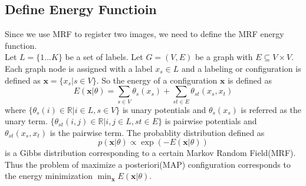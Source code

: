 \documentclass{article} %
\begin{document}
	\subsection{Define Energy Functioin}
	Since we use MRF to register two images, we need to define the MRF energy function. \\
	Let $L = \{1...K\}$ be a set of labels. Let $G = (V, E)$ be a graph with $E \subseteq V\times V$. Each graph node is assigned with a label $x_s \in L$ and a labeling or configuration is defined as $\mathbf{x} = \{x_s|s\in V\}$. So the energy of a configuration $\mathbf{x}$ is defined as 
	\begin{equation}
		E(\mathbf{x}|\theta) = \sum_{s\in V}\theta_s(x_s) + \sum_{st\in E}\theta_{st}(x_s, x_t)
	\end{equation}
	where $\displaystyle{\{\theta_s(i)\in\mathbb{R} | i\in L, s\in V\}}$ is unary potentials and $\theta_s(x_s)$ is referred as the unary term. $\displaystyle{\{\theta_{st}(i,j)\in\mathbb{R} | i,j\in L, st\in E\}}$ is pairwise potentials and $\theta_{st}(x_s, x_t)$ is the pairwise term. The probablity distribution defined as 
	\begin{equation}
		p(\mathbf{x}|\theta) \propto \exp(-E(\mathbf{x}|\theta))
	\end{equation}
	is a Gibbs distribution corresponding to a certain Markov Random Field(MRF). Thus the problem of maximize a posteriori(MAP) configuration corresponds to the energy minimization $\displaystyle{\min_{\mathbf{x}}E(\mathbf{x}|\theta)}$. \\
\end{document}
